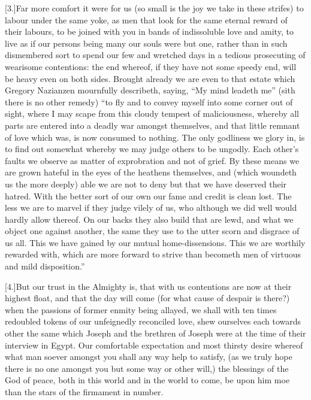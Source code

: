 [3.]Far more comfort it were for us (so small is the joy we take in these strifes) to labour under the same yoke, as men that look for the same eternal reward of their labours, to be joined with you in bands of indissoluble love and amity, to live as if our persons being many our souls were but one, rather than in such dismembered sort to spend our few and wretched days in a tedious prosecuting of wearisome contentions: the end whereof, if they have not some speedy end, will be heavy even on both sides. Brought already we are even to that estate which Gregory Nazianzen mournfully describeth, saying, “My mind leadeth me” (sith there is no other remedy) “to fly and to convey myself into some corner out of sight, where I may scape from this cloudy tempest of maliciousness, whereby all parts are entered into a deadly war amongst themselves, and that little remnant of love which was, is now consumed to nothing. The only godliness we glory in, is to find out somewhat whereby we may judge others to be ungodly. Each other’s faults we observe as matter of exprobration and not of grief. By these means we are grown hateful in the eyes of the heathens themselves, and (which woundeth us the more deeply) able we are not to deny but that we have deserved their hatred. With the better sort of our own our fame and credit is clean lost. The less we are to marvel if they judge vilely of us, who although we did well would hardly allow thereof. On our backs they also build that are lewd, and what we object one against another, the same they use to the utter scorn and disgrace of us all. This we have gained by our mutual home-dissensions. This we are worthily rewarded with, which are more forward to strive than becometh men of virtuous and mild disposition.”

[4.]But our trust in the Almighty is, that with us contentions are now at their highest float, and that the day will come (for what cause of despair is there?) when the passions of former enmity being allayed, we shall with ten times redoubled tokens of our unfeignedly reconciled love, shew ourselves each towards other the same which Joseph and the brethren of Joseph were at the time of their interview in Egypt. Our comfortable expectation and most thirsty desire whereof what man soever amongst you shall any way help to satisfy, (as we truly hope there is no one amongst you but some way or other will,) the blessings of the God of peace, both in this world and in the world to come, be upon him moe than the stars of the firmament in number.

\PRLsep

